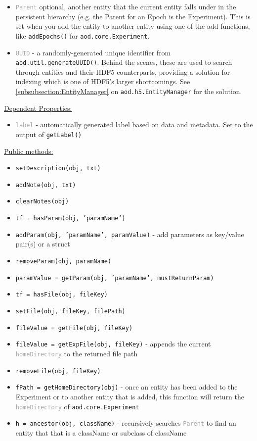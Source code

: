 \documentclass[10pt]{exam}
\newcommand\myurl[1]{\textcolor{blue}{\underline{#1}}}
\newcommand\aodclass[1]{\textcolor{codeblue}{\texttt{#1}}}
\newcommand\aodprop[1]{\textcolor{darkgray}{\texttt{#1}}}
\newcommand\aodfcn[1]{\textcolor{darkteal}{\texttt{#1}}}
\newcommand\docheader[1]{\vspace{0.6ex}\noindent\underline{#1}\vspace{0.15ex}}
\begin{document}
		\begin{itemize}
			\item \aodprop{Parent} optional, another entity that the current entity falls under in the persistent hierarchy (e.g. the Parent for an Epoch is the Experiment). This is set when you add the entity to another entity using one of the add functions, like \aodfcn{addEpochs()} for \aodclass{aod.core.Experiment}.
			\item \aodprop{UUID} - a randomly-generated unique identifier from \aodfcn{aod.util.generateUUID()}. Behind the scenes, these are used to search through entities and their HDF5 counterparts, providing a solution for indexing which is one of HDF5's larger shortcomings. See \myurl{\ref{subsubsection:EntityManager}} on \aodclass{aod.h5.EntityManager} for the solution.
		\end{itemize}
		\docheader{Dependent Properties:} 
		\begin{itemize}
			\item \aodprop{label} - automatically generated label based on data and metadata. Set to the output of \aodfcn{getLabel()}
		\end{itemize}
		\docheader{Public methods:}
		\begin{itemize}
			\item \aodfcn{setDescription(obj, txt)}
			\item \aodfcn{addNote(obj, txt)}
			\item \aodfcn{clearNotes(obj)}\\
			\item \aodfcn{tf = hasParam(obj, 'paramName')}
			\item \aodfcn{addParam(obj, 'paramName', paramValue)} - add parameters as key/value pair(s) or a struct
			\item \aodfcn{removeParam(obj, paramName)}
			\item \aodfcn{paramValue = getParam(obj, 'paramName', mustReturnParam)}\\
			\item \aodfcn{tf = hasFile(obj, fileKey)}
			\item \aodfcn{setFile(obj, fileKey, filePath)}
			\item \aodfcn{fileValue = getFile(obj, fileKey)}
			\item \aodfcn{fileValue = getExpFile(obj, fileKey)} - appends the current \aodprop{homeDirectory} to the returned file path
			\item \aodfcn{removeFile(obj, fileKey)}\\
			\item \aodfcn{fPath = getHomeDirectory(obj)} - once an entity has been added to the Experiment or to another entity that is added, this function will return the \aodprop{homeDirectory} of \aodclass{aod.core.Experiment}
			\item \aodfcn{h = ancestor(obj, className)} - recursively searches \aodprop{Parent} to find an entity that that is a className or subclass of className 
		\end{itemize}
\end{document}
